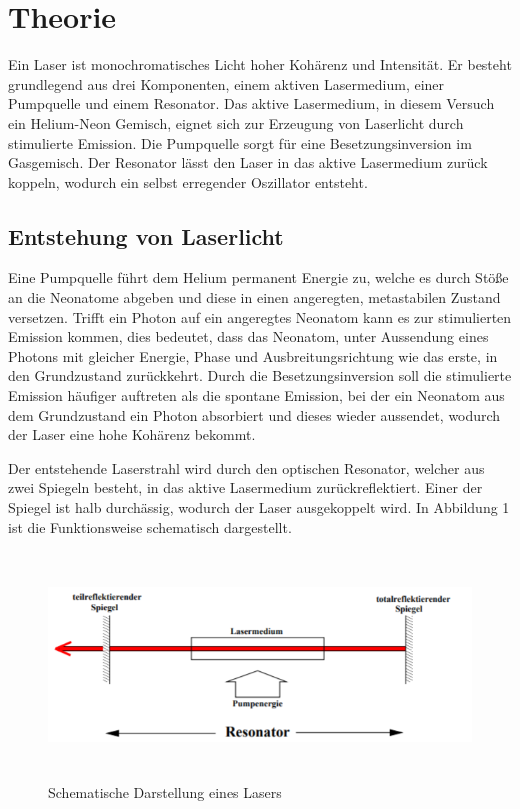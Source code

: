 \section{Theorie}
\label{sec:Theorie}

\cite{sample}

Ein Laser ist monochromatisches Licht hoher Kohärenz und Intensität. Er besteht grundlegend aus drei
Komponenten, einem aktiven Lasermedium, einer Pumpquelle und einem Resonator.
Das aktive Lasermedium, in diesem Versuch ein Helium-Neon Gemisch, eignet sich zur Erzeugung
von Laserlicht durch stimulierte Emission. Die Pumpquelle sorgt für eine Besetzungsinversion im Gasgemisch.
Der Resonator lässt den Laser in das aktive Lasermedium zurück koppeln, wodurch ein
selbst erregender Oszillator entsteht.

\subsection{Entstehung von Laserlicht}
Eine Pumpquelle führt dem Helium permanent Energie zu, welche es durch Stöße an
die Neonatome abgeben und diese in einen angeregten, metastabilen Zustand versetzen.
Trifft ein Photon auf ein angeregtes Neonatom kann es zur stimulierten Emission kommen, dies
bedeutet, dass das Neonatom, unter Aussendung eines Photons mit gleicher Energie, Phase und
Ausbreitungsrichtung wie das erste, in den Grundzustand zurückkehrt. Durch die Besetzungsinversion soll
die stimulierte Emission häufiger auftreten als die spontane Emission, bei der ein Neonatom aus
dem Grundzustand ein Photon absorbiert und dieses wieder aussendet, wodurch der Laser eine hohe
Kohärenz bekommt.

Der entstehende Laserstrahl wird durch den optischen Resonator, welcher aus zwei Spiegeln besteht,
in das aktive Lasermedium zurückreflektiert. Einer der Spiegel ist halb durchässig, wodurch der
Laser ausgekoppelt wird. In Abbildung 1 ist die Funktionsweise schematisch dargestellt.

\begin{figure}[H]
  \centering
  \includegraphics[height=6cm]{Lasermedium.PNG}
  \caption{Schematische Darstellung eines Lasers \cite{sample2}}
  \label{fig:Lock}
\end{figure}


